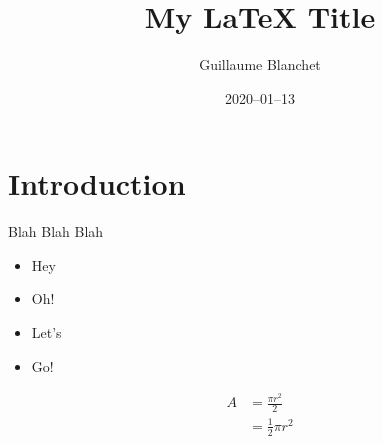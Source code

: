 \documentclass[12pt]{article}
\title{My LaTeX Title}
\author{Guillaume Blanchet}
\date{2020–01–13}
\begin{document}
\maketitle

\section{Introduction}

Blah Blah Blah

\begin{itemize}

\item Hey

\item Oh!

\item Let’s

\item Go!

\end{itemize}

\begin{equation} \label{eq1}
\begin{split}
A & = \frac{\pi r^2}{2} \\
& = \frac{1}{2} \pi r^2
\end{split}
\end{equation}
\end{document}
